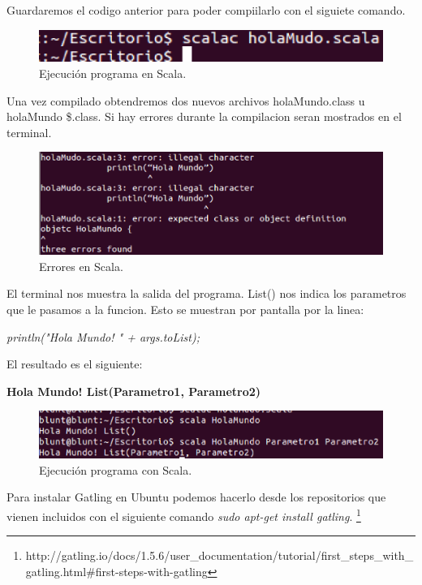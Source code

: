 Guardaremos el codigo anterior para poder compiilarlo con el siguiete comando.

\begin{figure}[H]
\begin{center}
\includegraphics[scale=0.4]{imagenes/opcional2-3.eps}
\caption{Ejecución programa en Scala.}
\end{center}
\end{figure}


Una vez compilado obtendremos dos nuevos archivos holaMundo.class u holaMundo \$.class.
Si hay errores durante la  compilacion seran mostrados en el terminal.
\begin{figure}[H]
\begin{center}
\includegraphics[scale=0.4]{imagenes/opcional2-4.eps}
\caption{Errores en Scala.}
\end{center}
\end{figure}

El terminal nos muestra la salida del programa. List() nos indica los parametros que le pasamos a la funcion. Esto se muestran por pantalla por la linea:

\textit{println("Hola Mundo! " + args.toList);}

El resultado es el siguiente:

\textbf{Hola Mundo! List(Parametro1, Parametro2)}
\begin{figure}[H]
\begin{center}
\includegraphics[scale=0.4]{imagenes/opcional2-5.eps}
\caption{Ejecución programa con Scala.}
\end{center}
\end{figure}

Para instalar Gatling en Ubuntu podemos hacerlo desde los repositorios que vienen incluidos con el siguiente comando \textit{sudo apt-get install gatling}.
\footnote{http://gatling.io/docs/1.5.6/user\_documentation/tutorial/first\_steps\_with\_gatling.html\#first-steps-with-gatling}
